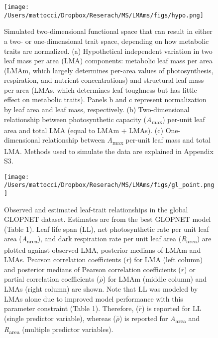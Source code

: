 \documentclass[
  12pt,
  letterpaper,
  DIV=11,
  numbers=noendperiod]{scrartcl}
\begin{document}
\newpage

\begin{figure}

{\centering \texttt{[image: /Users/mattocci/Dropbox/Reserach/MS/LMAms/figs/hypo.png]}

}

\caption{\label{fig-hypo}Simulated two-dimensional functional space that
can result in either a two- or one-dimensional trait space, depending on
how metabolic traits are normalized. (a) Hypothetical independent
variation in two leaf mass per area (LMA) components: metabolic leaf
mass per area (LMAm, which largely determines per-area values of
photosynthesis, respiration, and nutrient concentrations) and structural
leaf mass per area (LMAs, which determines leaf toughness but has little
effect on metabolic traits). Panels b and c represent normalization by
leaf area and leaf mass, respectively. (b) Two-dimensional relationship
between photosynthetic capacity (\emph{A}\textsubscript{max}) per-unit
leaf area and total LMA (equal to LMAm + LMAs). (c) One-dimensional
relationship between \emph{A}\textsubscript{max} per-unit leaf mass and
total LMA. Methods used to simulate the data are explained in Appendix
S3.}

\end{figure}

\begin{figure}

{\centering \texttt{[image: /Users/mattocci/Dropbox/Reserach/MS/LMAms/figs/gl\_point.png]}

}

\caption{\label{fig-gl_point}Observed and estimated leaf-trait
relationships in the global GLOPNET dataset. Estimates are from the best
GLOPNET model (Table 1). Leaf life span (LL), net photosynthetic rate
per unit leaf area (\emph{A}\textsubscript{area}), and dark respiration
rate per unit leaf area (\emph{R}\textsubscript{area}) are plotted
against observed LMA, posterior medians of LMAm and LMAs. Pearson
correlation coefficients (\emph{r}) for LMA (left column) and posterior
medians of Pearson correlation coefficients (\(\bar{r}\)) or partial
correlation coefficients (\(\bar{\rho}\)) for LMAm (middle column) and
LMAs (right column) are shown. Note that LL was modeled by LMAs alone
due to improved model performance with this parameter constraint (Table
1). Therefore, (\(\bar{r}\)) is reported for LL (single predictor
variable), whereas (\(\bar{\rho}\)) is reported for
\emph{A}\textsubscript{area} and \emph{R}\textsubscript{area} (multiple
predictor variables).}

\end{figure}
\end{document}
